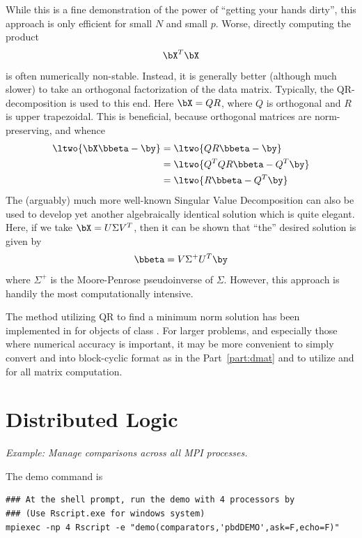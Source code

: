 While this is a fine demonstration of the power of ``getting your hands dirty'', this approach is only efficient for small $N$ and small $p$.  Worse, directly computing the product
\begin{align*}
\bX^T\bX
\end{align*}
is often numerically non-stable.  Instead, it is generally better (although much slower) to take an orthogonal factorization of the data matrix.  Typically, the QR-decomposition is used to this end.  Here $\bX=QR$, where $Q$ is orthogonal and $R$ is upper trapezoidal.  This is beneficial, because orthogonal matrices are norm-preserving, and whence
\begin{align*}
\ltwo{\bX\bbeta - \by} &= \ltwo{QR\bbeta - \by}\\
  &= \ltwo{Q^TQR\bbeta - Q^T\by}\\
  &= \ltwo{R\bbeta - Q^T\by}
\end{align*}
The (arguably) much more well-known Singular Value Decomposition can also be used to develop yet another algebraically identical solution which is quite elegant.  Here, if we take $\bX = U\Sigma V^T$, then it can be shown that ``the'' desired solution is given by
\begin{align*}
\bbeta = V\Sigma^+ U^T\by
\end{align*}
where $\Sigma^+$ is the Moore-Penrose pseudoinverse of $\Sigma$.  However, this approach is handily the most computationally intensive.

The method utilizing QR to find a minimum norm solution has been implemented in  for objects of class .  For larger problems, and especially those where numerical accuracy is important, it may be more convenient to simply convert  and  into block-cyclic format as in the Part~\ref{part:dmat} and
to utilize  and  for all matrix computation.


\section{Distributed Logic}

\emph{Example:  Manage comparisons across all MPI processes.}

The demo command is
\begin{lstlisting}
### At the shell prompt, run the demo with 4 processors by
### (Use Rscript.exe for windows system)
mpiexec -np 4 Rscript -e "demo(comparators,'pbdDEMO',ask=F,echo=F)"
\end{lstlisting}

